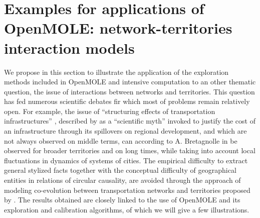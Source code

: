 \documentclass[10pt]{article}
\begin{document}
\section{Examples for applications of OpenMOLE: network-territories interaction models}


We propose in this section to illustrate the application of the exploration methods included in OpenMOLE and intensive computation to an other thematic question, the issue of interactions between networks and territories. This question has fed numerous scientific debates fir which most of problems remain relatively open. For example, the issue of ``structuring effects of transportation infrastructures'' \citep{bonnafous1974methodologies}, described by \cite{offner1993effets} as a ``scientific myth'' invoked to justify the cost of an infrastructure through its spillovers on regional development, and which are not always observed on middle terms, can according to A. Bretagnolle in \citep{offner2014effets} be observed for broader territories and on long times, while taking into account local fluctuations in dynamics of systems of cities. The empirical difficulty to extract general stylized facts together with the conceptual difficulty of geographical entities in relations of circular causality, are avoided through the approach of modeling co-evolution between transportation networks and territories proposed by \cite{raimbault2018modelisation}. The results obtained are closely linked to the use of OpenMOLE and its exploration and calibration algorithms, of which we will give a few illustrations.
\end{document}
